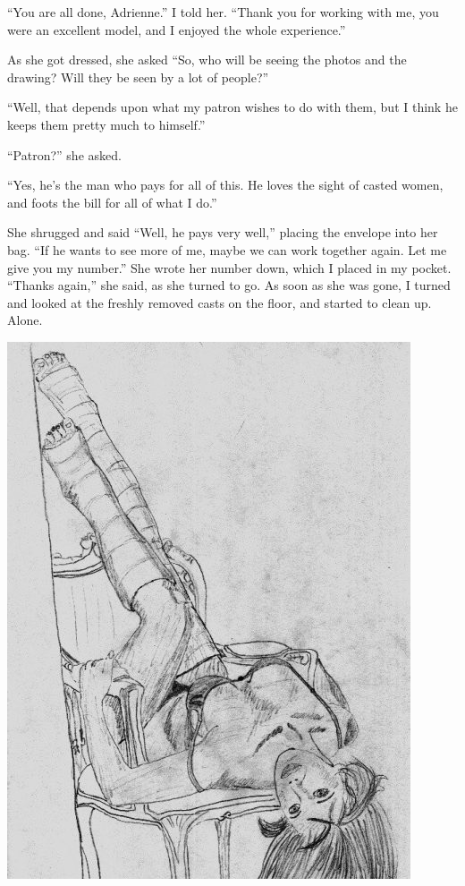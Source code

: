 ``You are all done, Adrienne.'' I told her. ``Thank you for working with me, you were an
excellent model, and I enjoyed the whole experience.''

As she got dressed, she asked ``So, who will be seeing the photos and the drawing? Will they
be seen by a lot of people?''

``Well, that depends upon what my patron wishes to do with them, but I think he keeps them
pretty much to himself.''

``Patron?'' she asked.

``Yes, he's the man who pays for all of this. He loves the sight of casted women, and foots
the bill for all of what I do.''

She shrugged and said ``Well, he pays very well,'' placing the envelope into her bag. ``If
he wants to see more of me, maybe we can work together again. Let me give you my number.'' She
wrote her number down, which I placed in my pocket. ``Thanks again,'' she said, as she turned to
go. As soon as she was gone, I turned and looked at the freshly removed casts on the floor, and
started to clean up. Alone.

\newpage
\begin{center}
\includegraphics{images/kicks02.jpg}
\end{center}
